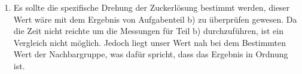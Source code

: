 \documentclass[12pt]{scrartcl}
\begin{document}
\begin{enumerate}
\begin{enumerate}
\end{enumerate}

\item Es sollte die spezifische Drehung der Zuckerlösung bestimmt werden, dieser Wert wäre mit dem Ergebnis von Aufgabenteil b) zu überprüfen gewesen. Da die Zeit nicht reichte um die Messungen für Teil b) durchzuführen, ist ein Vergleich nicht möglich. Jedoch liegt unser Wert nah bei dem Bestimmten Wert der Nachbargruppe, was dafür spricht, dass das Ergebnis in Ordnung ist.

\end{enumerate}





\end{document}
